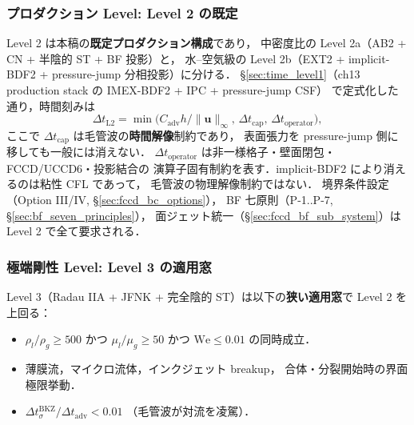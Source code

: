 \subsubsection{プロダクション Level: Level 2 の既定}
\label{sec:level2_production}

Level 2 は本稿の\textbf{既定プロダクション構成}であり，
中密度比の Level 2a（AB2 + CN + 半陰的 ST + BF 投影）と，
水--空気級の Level 2b（EXT2 + implicit-BDF2 + pressure-jump 分相投影）に分ける．
§\ref{sec:time_level1}（ch13 production stack の IMEX-BDF2 + IPC + pressure-jump CSF）
で定式化した通り，時間刻みは
\begin{equation}
  \Delta t_\text{L2}
    = \min\!\bigl(
        C_\text{adv} h/\|\mathbf{u}\|_\infty,\,
        \Delta t_\text{cap},\,
        \Delta t_\text{operator}
      \bigr),
  \label{eq:level2_dt}
\end{equation}
ここで $\Delta t_\text{cap}$ は毛管波の\textbf{時間解像}制約であり，
表面張力を pressure-jump 側に移しても一般には消えない．
$\Delta t_\text{operator}$ は非一様格子・壁面閉包・FCCD/UCCD6・投影結合の
演算子固有制約を表す．implicit-BDF2 により消えるのは粘性 CFL であって，
毛管波の物理解像制約ではない．
境界条件設定（Option III/IV, §\ref{sec:fccd_bc_options}），
BF 七原則（P-1..P-7, §\ref{sec:bf_seven_principles}），
面ジェット統一（§\ref{sec:fccd_bf_sub_system}）は
Level 2 で全て要求される．

\subsubsection{極端剛性 Level: Level 3 の適用窓}
\label{sec:level3_stiff_regime}

Level 3（Radau IIA + JFNK + 完全陰的 ST）は以下の\textbf{狭い適用窓}で
Level 2 を上回る：
\begin{itemize}[noitemsep]
  \item $\rho_l/\rho_g \ge 500$ かつ $\mu_l/\mu_g \ge 50$ かつ $\text{We} \le 0.01$
        の同時成立．
  \item 薄膜流，マイクロ流体，インクジェット breakup，
        合体・分裂開始時の界面極限挙動．
  \item $\Delta t_\sigma^\text{BKZ}/\Delta t_\text{adv} < 0.01$
        （毛管波が対流を凌駕）．
\end{itemize}

